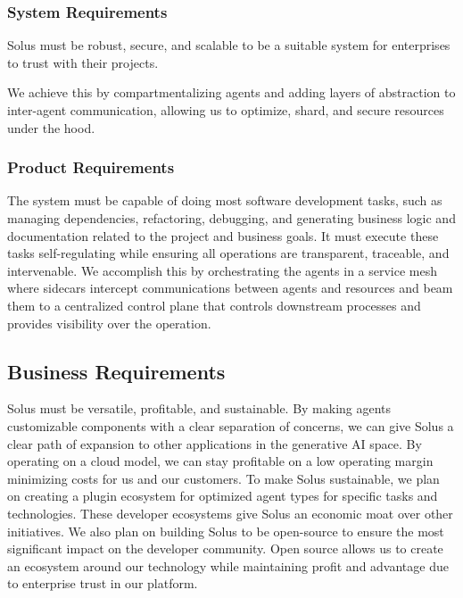 \documentclass[a4paper,twocolumn,11pt]{quantumarticle}
\begin{document}
\subsubsection{System Requirements}
Solus must be robust, secure, and scalable to be a suitable system for enterprises to trust with their projects.

We achieve this by compartmentalizing agents and adding layers of abstraction to inter-agent communication, allowing us to optimize, shard, and secure resources under the hood.

\subsubsection{Product Requirements}
The system must be capable of doing most software development tasks, such as managing dependencies, refactoring, debugging, and generating business logic and documentation related to the project and business goals. It must execute these tasks self-regulating while ensuring all operations are transparent, traceable, and intervenable. We accomplish this by orchestrating the agents in a service mesh where sidecars intercept communications between agents and resources and beam them to a centralized control plane that controls downstream processes and provides visibility over the operation.

\subsection{Business Requirements}
Solus must be versatile, profitable, and sustainable. By making agents customizable components with a clear separation of concerns, we can give Solus a clear path of expansion to other applications in the generative AI space. By operating on a cloud model, we can stay profitable on a low operating margin minimizing costs for us and our customers. To make Solus sustainable, we plan on creating a plugin ecosystem for optimized agent types for specific tasks and technologies. These developer ecosystems give Solus an economic moat over other initiatives. We also plan on building Solus to be open-source to ensure the most significant impact on the developer community. Open source allows us to create an ecosystem around our technology while maintaining profit and advantage due to enterprise trust in our platform.


\end{document}
